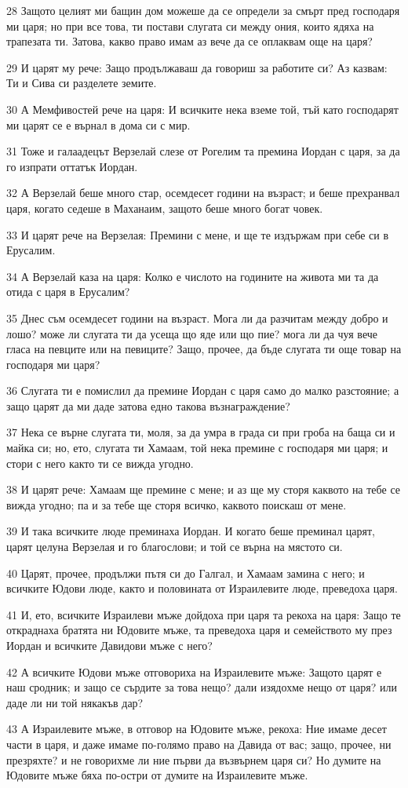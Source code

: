 \par 28 Защото целият ми бащин дом можеше да се определи за смърт пред господаря ми царя; но при все това, ти постави слугата си между ония, които ядяха на трапезата ти. Затова, какво право имам аз вече да се оплаквам още на царя?
\par 29 И царят му рече: Защо продължаваш да говориш за работите си? Аз казвам: Ти и Сива си разделете земите.
\par 30 А Мемфивостей рече на царя: И всичките нека вземе той, тъй като господарят ми царят се е върнал в дома си с мир.
\par 31 Тоже и галаадецът Верзелай слезе от Рогелим та премина Иордан с царя, за да го изпрати оттатък Иордан.
\par 32 А Верзелай беше много стар, осемдесет години на възраст; и беше прехранвал царя, когато седеше в Маханаим, защото беше много богат човек.
\par 33 И царят рече на Верзелая: Премини с мене, и ще те издържам при себе си в Ерусалим.
\par 34 А Верзелай каза на царя: Колко е числото на годините на живота ми та да отида с царя в Ерусалим?
\par 35 Днес съм осемдесет години на възраст. Мога ли да разчитам между добро и лошо? може ли слугата ти да усеща що яде или що пие? мога ли да чуя вече гласа на певците или на певиците? Защо, прочее, да бъде слугата ти още товар на господаря ми царя?
\par 36 Слугата ти е помислил да премине Иордан с царя само до малко разстояние; а защо царят да ми даде затова едно такова възнаграждение?
\par 37 Нека се върне слугата ти, моля, за да умра в града си при гроба на баща си и майка си; но, ето, слугата ти Хамаам, той нека премине с господаря ми царя; и стори с него както ти се вижда угодно.
\par 38 И царят рече: Хамаам ще премине с мене; и аз ще му сторя каквото на тебе се вижда угодно; па и за тебе ще сторя всичко, каквото поискаш от мене.
\par 39 И така всичките люде преминаха Иордан. И когато беше преминал царят, царят целуна Верзелая и го благослови; и той се върна на мястото си.
\par 40 Царят, прочее, продължи пътя си до Галгал, и Хамаам замина с него; и всичките Юдови люде, както и половината от Израилевите люде, преведоха царя.
\par 41 И, ето, всичките Израилеви мъже дойдоха при царя та рекоха на царя: Защо те откраднаха братята ни Юдовите мъже, та преведоха царя и семейството му през Иордан и всичките Давидови мъже с него?
\par 42 А всичките Юдови мъже отговориха на Израилевите мъже: Защото царят е наш сродник; и защо се сърдите за това нещо? дали изядохме нещо от царя? или даде ли ни той някакъв дар?
\par 43 А Израилевите мъже, в отговор на Юдовите мъже, рекоха: Ние имаме десет части в царя, и даже имаме по-голямо право на Давида от вас; защо, прочее, ни презряхте? и не говорихме ли ние първи да възвърнем царя си? Но думите на Юдовите мъже бяха по-остри от думите на Израилевите мъже.


